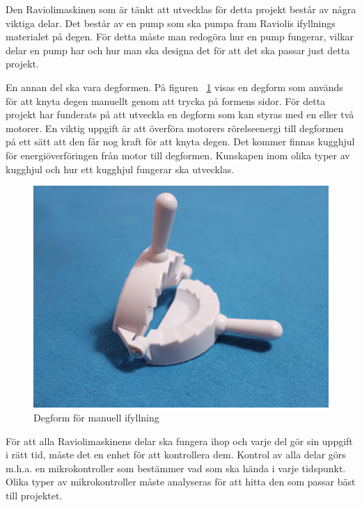 Den Raviolimaskinen som är tänkt att utvecklas för detta projekt består av några viktiga delar. Det består av en pump som ska pumpa fram Raviolis ifyllnings materialet på degen. För detta måste man redogöra hur en pump fungerar, vilkar delar en pump har och hur man ska designa det för att det ska passar just detta projekt.\medskip

En annan del ska vara degformen. På figuren ~\ref{degfrom} visas en degform som används för att knyta degen manuellt genom att trycka på formens sidor. För detta projekt har funderats på att utveckla en degform som kan styras med en eller två motorer. En viktig uppgift är att överföra motorers rörelseenergi till degformen på ett sätt att den får nog kraft för att knyta degen. Det kommer finnas kugghjul för energiöverföringen från motor till degformen. Kunskapen inom olika typer av kugghjul och hur ett kugghjul fungerar ska utvecklas.\medskip

\begin{figure}[h]
	\begin{center}
		\includegraphics[scale=0.08] {images/degform.jpg}
		\caption{Degform för manuell ifyllning}
		\label{degfrom}	
	\end{center}
\end{figure}\medskip

För att alla Raviolimaskinens delar ska fungera ihop och varje del gör sin uppgift i rätt tid, måste det en enhet för att kontrollera dem. Kontrol av alla delar görs m.h.a. en mikrokontroller som bestämmer vad som ska hända i varje tidspunkt. Olika typer av mikrokontroller måste analyseras för att hitta den som passar bäst till projektet.




